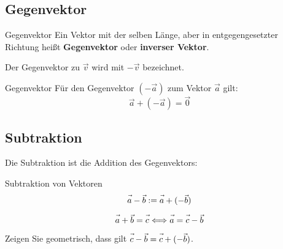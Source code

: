 \subsection{Gegenvektor}

\begin{definition}{Gegenvektor}{}
  Ein Vektor mit der selben Länge, aber in entgegengesetzter Richtung
  heißt \textbf{Gegenvektor} oder \textbf{inverser Vektor}.

  Der Gegenvektor zu $\vec{v}$ wird mit $-\vec{v}$ bezeichnet.
\end{definition}

\begin{bemerkung}{Gegenvektor}{}
  Für den Gegenvektor $(-\vec{a})$ zum Vektor $\vec{a}$ gilt:
  $$\vec{a} + (-\vec{a}) = \vec{0}$$
  
\end{bemerkung}



\newpage


\subsection{Subtraktion}

Die Subtraktion ist die Addition des Gegenvektors:

\begin{definition}{Subtraktion von Vektoren}{}
  $$\vec{a\vphantom{b}} - \vec{b} := \vec{a\vphantom{b}} + (-\vec{b})$$
\end{definition}

\begin{bemerkung}{}{}
  $$\vec{a\vphantom{b}} + \vec{b} = \vec{c\vphantom{b}} \Longleftrightarrow \vec{a\vphantom{b}} = \vec{c\vphantom{b}} - \vec{b}$$
\end{bemerkung}

Zeigen Sie geometrisch, dass gilt $\vec{c\vphantom{b}} - \vec{b} = \vec{c\vphantom{b}} +
(-\vec{b})$.


